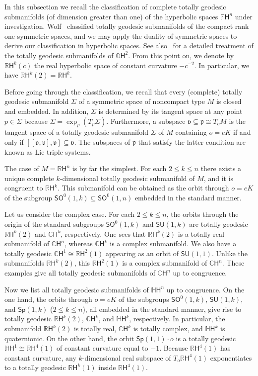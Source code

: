 \documentclass[12pt, a4paper]{amsart}
\newcommand{\g}{\mathfrak}
\newcommand{\s}{\mathsf}
\newcommand{\R}{\mathbb{R}}
\newcommand{\C}{\mathbb{C}}
\renewcommand{\H}{\mathbb{H}}
\renewcommand{\O}{\mathbb{O}}
\newcommand{\F}{\mathbb{F}}
\theoremstyle{definition}
\begin{document}
In this subsection we recall the classification of complete totally geodesic submanifolds (of dimension greater than one) of the hyperbolic spaces $\F\s{H}^n$ under investigation.
Wolf~\cite{wolf} classified totally geodesic submanifolds of the compact rank one symmetric spaces, and we may apply the duality of symmetric spaces to derive our classification in hyperbolic spaces.
See also~\cite[Section~5]{kollross-octonions} for a detailed treatment of the totally 
geodesic submanifolds of $\O\s{H}^2$.
From this point on, we denote by $\R\s{H}^k(c)$ the real hyperbolic space of constant curvature $-c^{-2}$.
In particular, we have $\R\s{H}^k(2)=\R\s{H}^k$.

Before going through the classification, we recall that every (complete) totally geodesic submanifold $\Sigma$ of a symmetric space of noncompact type $M$ is closed and embedded.
In addition, $\Sigma$ is determined by its tangent space at any point $p \in \Sigma$ because $\Sigma = \exp_p (T_p\Sigma)$.
Furthermore, a subspace $\g{v}\subseteq \g{p}\cong T_o M$ is the tangent space of a totally geodesic submanifold $\Sigma$ of $M$ containing $o=eK$ if and only if $[[\g{v},\g{v}],\g{v}]\subseteq \g{v}$.
The subspaces of $\g{p}$ that satisfy the latter condition are known as Lie triple systems.

The case of $M=\R\s{H}^n$ is by far the simplest.
For each $2\leq k \leq n$ there exists a unique complete $k$-dimensional totally geodesic submanifold of $M$, and it is congruent to $\R\s{H}^k$.
This submanifold can be obtained as the orbit through $o=e{K}$ of the subgroup $\s{SO}^0(1,k)\subseteq \s{SO}^0(1,n)$ embedded in the standard manner.

Let us consider the complex case.
For each $2\leq k\leq n$, the orbits through the origin of the standard subgroups $\s{SO}^0(1,k)$ and $\s{SU}(1,k)$
are totally geodesic $\R\s{H}^k(2)$ and $\C\s{H}^k$, respectively.
One sees that $\R\s{H}^k(2)$ is a totally real submanifold of $\C\s{H}^n$, whereas $\C\s{H}^k$ is a complex submanifold.
We also have a totally geodesic $\C\s{H}^1\cong \R \s{H}^2(1)$ appearing as an orbit of $\s{SU}(1,1)$.
Unlike the submanifolds $\R\s{H}^k(2)$, this $\R\s{H}^2(1)$ is a complex submanifold of $\C\s{H}^n$.
These examples give all totally geodesic submanifolds of $\C\s{H}^n$ up to congruence.

Now we list all totally geodesic submanifolds of $\H\s{H}^n$ up to congruence.
On the one hand, the orbits through $o=e{K}$ of the subgroups $\s{SO}^0(1,k)$, $\s{SU}(1,k)$, and $\s{Sp}(1,k)$ 
($2\leq k\leq n$), all embedded in the standard manner, 
give rise to totally geodesic $\R\s{H}^k(2)$, $\C\s{H}^k$, and $\H\s{H}^k$, respectively.
In particular, the submanifold $\R\s{H}^k(2)$ is totally real,
$\C\s{H}^k$ is totally complex, and $\H\s{H}^k$ is quaternionic.
On the other hand, the orbit $\s{Sp}(1,1)\cdot o$ is a totally geodesic $\H\s{H}^1\cong \R \s{H}^4(1)$ of constant curvature equal to $-1$.
Because $\R\s{H}^4(1)$ has constant curvature, any $k$-dimensional real subspace of $T_o\R\s{H}^4(1)$ exponentiates to a totally geodesic $\R\s{H}^k(1)$ inside $\R\s{H}^4(1)$.
\end{document}

